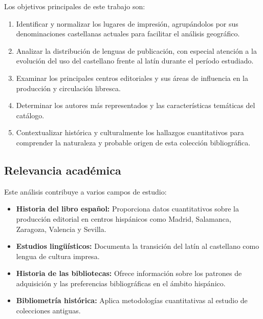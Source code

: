 \documentclass[12pt,a4paper]{article}
\begin{document}
Los objetivos principales de este trabajo son:

\begin{enumerate}
    \item Identificar y normalizar los lugares de impresión, agrupándolos por sus denominaciones castellanas actuales para facilitar el análisis geográfico.

    \item Analizar la distribución de lenguas de publicación, con especial atención a la evolución del uso del castellano frente al latín durante el período estudiado.

    \item Examinar los principales centros editoriales y sus áreas de influencia en la producción y circulación libresca.

    \item Determinar los autores más representados y las características temáticas del catálogo.

    \item Contextualizar histórica y culturalmente los hallazgos cuantitativos para comprender la naturaleza y probable origen de esta colección bibliográfica.
\end{enumerate}

\subsection{Relevancia académica}

Este análisis contribuye a varios campos de estudio:

\begin{itemize}
    \item \textbf{Historia del libro español:} Proporciona datos cuantitativos sobre la producción editorial en centros hispánicos como Madrid, Salamanca, Zaragoza, Valencia y Sevilla.

    \item \textbf{Estudios lingüísticos:} Documenta la transición del latín al castellano como lengua de cultura impresa.

    \item \textbf{Historia de las bibliotecas:} Ofrece información sobre los patrones de adquisición y las preferencias bibliográficas en el ámbito hispánico.

    \item \textbf{Bibliometría histórica:} Aplica metodologías cuantitativas al estudio de colecciones antiguas.
\end{itemize}
\end{document}
